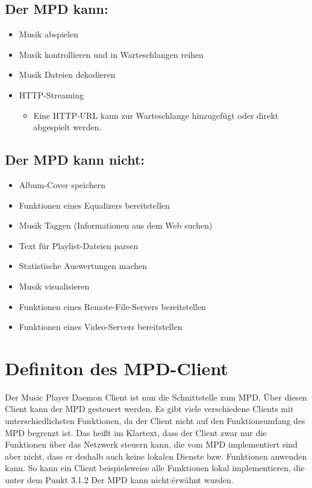 \subsection{Der MPD kann:}
\renewcommand{\labelitemi}{•}
\begin{itemize}
    \item Musik abspielen
    \item Musik kontrollieren und in Warteschlangen reihen 
    \item Musik Dateien dekodieren
    \item HTTP-Streaming
        \renewcommand{\labelitemi}{--}
        \begin{itemize}
            \item Eine HTTP-URL kann zur Warteschlange hinzugefügt oder direkt abgespielt werden.\\
        \end{itemize}
\end{itemize}

\subsection{Der MPD kann nicht:}
\begin{itemize}
    \item Album-Cover speichern
    \item Funktionen eines Equalizers bereitstellen
    \item Musik Taggen (Informationen aus dem Web suchen)
    \item Text für Playlist-Dateien parsen
    \item Statistische Auswertungen machen
    \item Musik visualisieren
    \item Funktionen eines Remote-File-Servers bereitstellen
    \item Funktionen eines Video-Servers bereitstellen
\end{itemize}
\section{Definiton des MPD-Client}
Der Music Player Daemon Client ist nun die Schnittstelle zum MPD. Über diesen Client kann der MPD
gesteuert werden. Es gibt viele verschiedene Clients mit unterschiedlichsten Funktionen, da der 
Client nicht auf den Funktionsumfang des MPD begrenzt ist. Das heißt im Klartext, dass der Client
zwar nur die Funktionen über das Netzwerk steuern kann, die vom MPD implementiert sind aber nicht, 
dass er deshalb auch keine lokalen Dienste bzw. Funktionen anwenden kann. So kann ein Client 
beispielsweise alle Funktionen lokal implementieren, die unter dem Punkt \"3.1.2 Der MPD kann nicht:\" 
erwähnt wurden.
\newpage
